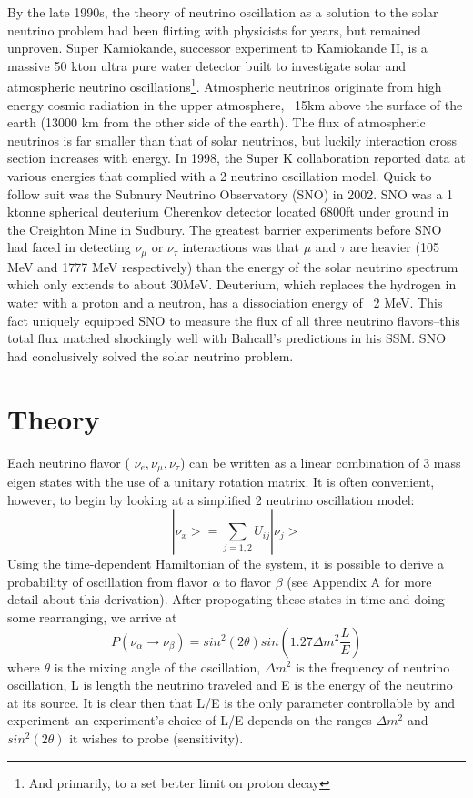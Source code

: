 \documentclass[12pt]{article}
\begin{document}
\par By the late 1990s, the theory of neutrino oscillation as a solution to the solar neutrino problem had been flirting with physicists for years, but remained unproven.  Super Kamiokande, successor experiment to Kamiokande II, is a massive 50 kton ultra pure water detector built to investigate solar and atmospheric neutrino oscillations\footnote{And primarily, to a set better limit on proton decay}.  Atmospheric neutrinos originate from high energy cosmic radiation in the upper atmosphere, ~15km above the surface of the earth (13000 km from the other side of the earth). The flux of atmospheric neutrinos is far smaller than that of solar neutrinos, but luckily interaction cross section increases with energy. In 1998, the Super K collaboration reported data at various energies that complied with a 2 neutrino oscillation model\cite{superk}.
Quick to follow suit was the Subnury Neutrino Observatory (SNO) in 2002.  SNO was a 1 ktonne spherical deuterium Cherenkov detector located 6800ft under ground in the Creighton Mine in Sudbury\cite{sno}. The greatest barrier experiments before SNO had faced in detecting $\nu_\mu$ or $\nu_\tau$ interactions was that $\mu$ and $\tau$ are heavier (105 MeV and 1777 MeV respectively) than the energy of the solar neutrino spectrum which only extends to about 30MeV. Deuterium, which replaces the hydrogen in water with a proton and a neutron, has a dissociation energy of ~2 MeV. This fact uniquely equipped SNO to measure the flux of all three neutrino flavors\cite{sno}--this total flux matched shockingly well with Bahcall's predictions in his SSM. SNO had conclusively solved the solar neutrino problem.  

\section{Theory}

\par Each neutrino flavor ( $\nu_e, \nu_\mu, \nu_\tau$) can be written as a linear combination of 3 mass eigen states with the use of a unitary rotation matrix. It is often convenient, however, to begin by looking at a simplified 2 neutrino oscillation model:
\begin{equation} \label{eq:eig}
|\nu_x> = \sum_{j=1,2} U_{ij} |\nu_j>  
\end{equation}
Using the time-dependent Hamiltonian of the system, it is possible to derive a probability of oscillation from flavor $\alpha$ to flavor $\beta$ (see Appendix A for more detail about this derivation).  After propogating these states in time and doing some rearranging, we arrive at 
\begin{equation} \label{eq:prob}
P(\nu_\alpha \rightarrow \nu_\beta) = sin^2(2\theta)sin(1.27\Delta m^2  \frac{L}{E})
\end{equation}
where $\theta$ is the mixing angle of the oscillation, $\Delta m^2$ is the frequency of neutrino oscillation, L is length the neutrino traveled and E is the energy of the neutrino at its source.  It is clear then that L/E is the only parameter controllable by and experiment--an experiment's choice of L/E depends on the ranges $\Delta m^2$ and $sin^2(2\theta)$ it wishes to probe (sensitivity).
\end{document}

